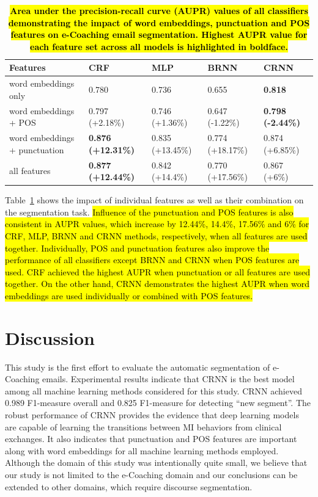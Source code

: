 \documentclass{amia}
\begin{document}
\begin{table}[ht]
\centering
\caption{\textbf{\hl{Area under the precision-recall curve (AUPR) values of all classifiers demonstrating the impact of word embeddings, punctuation and POS features on e-Coaching email segmentation. Highest AUPR value for each feature set across all models is highlighted in boldface.}}}
\label{tab:result_aupr}
 \begin{tabular}{|l|l|l|l|l|}
  \hline
\textbf{Features} & \textbf{CRF} & \textbf{MLP}  & \textbf{BRNN} & \textbf{CRNN} \\ \hline      
 word embeddings only & 0.780 & 0.736 & 0.655 & \textbf{0.818} \\ \hline
 word embeddings + POS & 0.797 (+2.18\%) & 0.746 (+1.36\%) & 0.647 (-1.22\%) & \textbf{0.798 (-2.44\%)} \\ \hline
 word embeddings + punctuation & \textbf{0.876 (+12.31\%)} & 0.835 (+13.45\%) & 0.774 (+18.17\%) & 0.874 (+6.85\%) \\ \hline
 all features & \textbf{0.877 (+12.44\%)} & 0.842 (+14.4\%) & 0.770 (+17.56\%) & 0.867 (+6\%) \\ \hline
  \end{tabular}
\end{table}     

Table~\ref{tab:result_aupr} shows the impact of individual features as well as their combination on the segmentation task. \hl{Influence of the punctuation and POS features is also consistent in AUPR values, which increase by 12.44\%, 14.4\%, 17.56\% and 6\% for CRF, MLP, BRNN and CRNN methods, respectively, when all features are used together. Individually, POS and punctuation features also improve the performance of all classifiers except BRNN and CRNN when POS features are used. CRF achieved the highest AUPR when punctuation or all features are used together. On the other hand, CRNN demonstrates the highest AUPR when word embeddings are used individually or combined with POS features.}

\section*{Discussion}
This study is the first effort to evaluate the automatic segmentation of e-Coaching emails. Experimental results indicate that CRNN is the best model among all machine learning methods considered for this study. CRNN achieved 0.989 F1-measure overall and 0.825 F1-measure for detecting ``new segment''. The robust performance of CRNN provides the evidence that deep learning models are capable of learning the transitions between MI behaviors from clinical exchanges. It also indicates that punctuation and POS features are important along with word embeddings for all machine learning methods employed. Although the domain of this study was intentionally quite small, we believe that our study is not limited to the e-Coaching domain and our conclusions can be extended to other domains, which require discourse segmentation.
\end{document}
